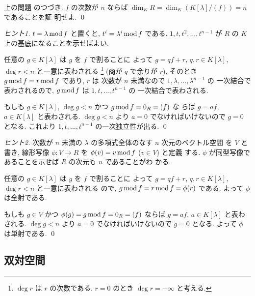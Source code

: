 \documentclass[12pt,twoside]{jarticle}
\begin{document}

\begin{question}
  \label{q:K[x]/(f)-2}
  上の問題  のつづき.
  $f$ の次数が $n$ ならば $\dim_K R=\dim_K(K[\lambda]/(f))=n$ であることを証
  明せよ. \qed
\end{question}

\begin{proof}[ヒント1]
  $t=\lambda\mathop{\mathrm{mod}}\nolimits f$ と置くと, $t^i=\lambda^i\mathop{\mathrm{mod}}\nolimits f$ である.
  $1,t,t^2,\ldots,t^{n-1}$ が $R$ の $K$ 上の基底になることを示せばよい.

  任意の $g\in K[\lambda]$ は $g$ を $f$ で割ることに
  よって $g=qf+r$, $q,r\in K[\lambda]$, $\deg r<n$ と一意に表わされる%
  \footnote{$\deg r$ は $r$ の次数である.
    $r=0$ のとき $\deg r = -\infty$ と考える.}
  (商が $q$ で余りが $r$).
  そのとき $g\mathop{\mathrm{mod}}\nolimits f=r\mathop{\mathrm{mod}}\nolimits f$ であり, $r$ は
  次数が $n$ 未満なので $1,\lambda,\ldots,\lambda^{n-1}$ の
  一次結合で表わされるので, $g\mathop{\mathrm{mod}}\nolimits f$ は $1,t,\ldots,t^{n-1}$ の
  一次結合で表わされる.

  もしも $g\in K[\lambda]$, $\deg g<n$ かつ $g\mathop{\mathrm{mod}}\nolimits f=0_R=(f)$ な
  らば $g=af$, $a\in K[\lambda]$ と表わされる.
  $\deg g<n$ より $a=0$ でなければいけないので $g=0$ となる.  
  これより $1,t,\ldots,t^{n-1}$ の一次独立性が出る.
  \qed
\end{proof}

\begin{proof}[ヒント2]
  次数が $n$ 未満の $\lambda$ の多項式全体のなす $n$ 次元のベクトル空間
  を $V$ と書き, 線形写像 $\phi:V\to R$ を $\phi(v)=v\mathop{\mathrm{mod}}\nolimits f$ ($v\in V$) と定義
  する.  $\phi$ が同型写像であることを示せば $R$ の次元も $n$ であることがわ
  かる.

  任意の $g\in K[\lambda]$ は $g$ を $f$ で割ることに
  よって $g=qf+r$, $q,r\in K[\lambda]$, $\deg r<n$ と一意に表わされる
  ので, $g\mathop{\mathrm{mod}}\nolimits f=r\mathop{\mathrm{mod}}\nolimits f=\phi(r)$ である.  よって $\phi$ は全射である.

  もしも $g\in V$ かつ $\phi(g) = g\mathop{\mathrm{mod}}\nolimits f=0_R=(f)$ 
  ならば $g=af$, $a\in K[\lambda]$ と表わされる.
  $\deg g<n$ より $a=0$ でなければいけないので $g=0$ となる.  
  よって $\phi$ は単射である.
  \qed
\end{proof}


\subsection{双対空間}
\label{sec:dual-space}
\end{document}
